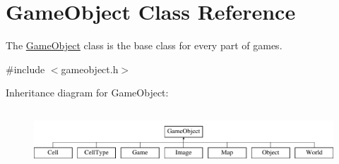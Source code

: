 \hypertarget{class_game_object}{\section{\-Game\-Object \-Class \-Reference}
\label{class_game_object}
}


\-The \hyperlink{class_game_object}{\-Game\-Object} class is the base class for every part of games.  




{\ttfamily \#include $<$gameobject.\-h$>$}

\-Inheritance diagram for \-Game\-Object\-:\begin{figure}[H]
\begin{center}
\leavevmode
\includegraphics[height=2.209945cm]{class_game_object}
\end{center}
\end{figure}
